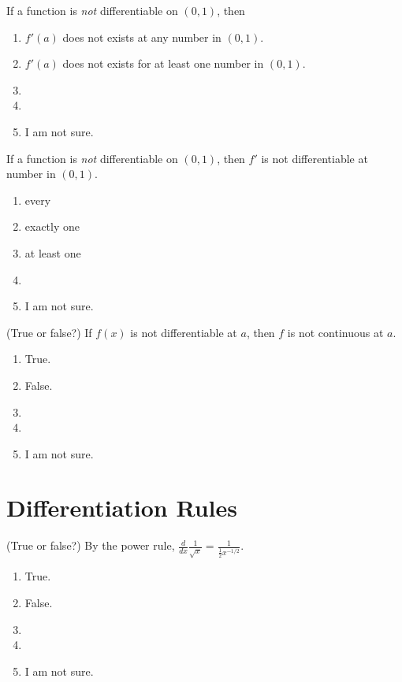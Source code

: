 \documentclass[14pt]{beamer}
\begin{document}
\begin{frame}
  If a function is \emph{not} differentiable on \((0,1)\), then 

  \medskip
  \begin{enumerate} 
    \item \(f'(a)\) does not exists at any number in \((0,1)\).
    \item \(f'(a)\) does not exists for at least one number in \((0,1)\).
    \item 
    \item 
    \item I am not sure.
  \end{enumerate} 
\end{frame}


\begin{frame}
  If a function is \emph{not} differentiable on \((0,1)\), then \(f'\) is not differentiable at \underline{\hspace{1in}} number in \((0,1)\).

  \medskip
  \begin{enumerate} 
    \item every 
    \item exactly one
    \item at least one
    \item 
    \item I am not sure.
  \end{enumerate} 
\end{frame}


\begin{frame}
  (True or false?) If \(f(x)\) is not differentiable at \(a\), then \(f\) is not continuous at \(a\).

  \medskip
  \begin{enumerate} 
    \item True.
    \item False.
    \item 
    \item 
    \item I am not sure.
  \end{enumerate} 
\end{frame}


\section{Differentiation Rules}
\begin{frame}
  (True or false?) By the power rule, \(\frac{d}{dx} \frac{1}{\sqrt{x}} = \frac{1}{\frac{1}{2}x^{-1/2}}\).

  \medskip
  \begin{enumerate} 
    \item True.
    \item False.
    \item 
    \item 
    \item I am not sure.
  \end{enumerate} 
\end{frame}
\end{document}
